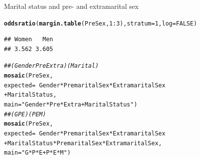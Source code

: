 \documentclass[11pt]{book}\usepackage[]{graphicx}\usepackage[]{color}
\makeatletter
\newcommand{\hlnum}[1]{\textcolor[rgb]{0.686,0.059,0.569}{#1}}%
\newcommand{\hlstr}[1]{\textcolor[rgb]{0.192,0.494,0.8}{#1}}%
\newcommand{\hlcom}[1]{\textcolor[rgb]{0.678,0.584,0.686}{\textit{#1}}}%
\newcommand{\hlopt}[1]{\textcolor[rgb]{0,0,0}{#1}}%
\newcommand{\hlstd}[1]{\textcolor[rgb]{0.345,0.345,0.345}{#1}}%
\newcommand{\hlkwc}[1]{\textcolor[rgb]{0.333,0.667,0.333}{#1}}%
\newcommand{\hlkwd}[1]{\textcolor[rgb]{0.737,0.353,0.396}{\textbf{#1}}}%
\newenvironment{kframe}{%
 \def\at@end@of@kframe{}%
 \ifinner\ifhmode%
  \def\at@end@of@kframe{\end{minipage}}%
  \begin{minipage}{\columnwidth}%
 \fi\fi%
 \def\FrameCommand##1{\hskip\@totalleftmargin \hskip-\fboxsep
 \colorbox{shadecolor}{##1}\hskip-\fboxsep
     \hskip-\linewidth \hskip-\@totalleftmargin \hskip\columnwidth}%
 \MakeFramed {\advance\hsize-\width
   \@totalleftmargin\z@ \linewidth\hsize
   \@setminipage}}%
 {\par\unskip\endMakeFramed%
 \at@end@of@kframe}
\newenvironment{knitrout}{}{} %
\renewenvironment{knitrout}{\small\renewcommand{\baselinestretch}{.85}}{} %
\makeatother
\begin{document}
\begin{Example}[marital1]{Marital status and pre- and extramarital sex}
\begin{knitrout}
\color{fgcolor}\begin{kframe}
\begin{alltt}
\hlkwd{oddsratio}\hlstd{(}\hlkwd{margin.table}\hlstd{(PreSex,} \hlnum{1}\hlopt{:}\hlnum{3}\hlstd{),} \hlkwc{stratum}\hlstd{=}\hlnum{1}\hlstd{,} \hlkwc{log}\hlstd{=}\hlnum{FALSE}\hlstd{)}
\end{alltt}
\begin{verbatim}
## Women   Men 
## 3.562 3.605
\end{verbatim}
\end{kframe}
\end{knitrout}




\begin{knitrout}
\color{fgcolor}\begin{kframe}
\begin{alltt}
\hlcom{## (Gender Pre Extra)(Marital)}
\hlkwd{mosaic}\hlstd{(PreSex,}
       \hlkwc{expected} \hlstd{=} \hlopt{~}\hlstd{Gender}\hlopt{*}\hlstd{PremaritalSex}\hlopt{*}\hlstd{ExtramaritalSex}
                  \hlopt{+} \hlstd{MaritalStatus,}
       \hlkwc{main} \hlstd{=} \hlstr{"Gender*Pre*Extra + MaritalStatus"}\hlstd{)}
\hlcom{## (GPE)(PEM)}
\hlkwd{mosaic}\hlstd{(PreSex,}
       \hlkwc{expected} \hlstd{=} \hlopt{~} \hlstd{Gender} \hlopt{*} \hlstd{PremaritalSex} \hlopt{*} \hlstd{ExtramaritalSex}
                  \hlopt{+} \hlstd{MaritalStatus} \hlopt{*} \hlstd{PremaritalSex} \hlopt{*} \hlstd{ExtramaritalSex,}
       \hlkwc{main} \hlstd{=} \hlstr{"G*P*E + P*E*M"}\hlstd{)}
\end{alltt}
\end{kframe}\begin{figure}[htbp]



\end{figure}
\end{knitrout}
\end{Example}
\end{document}
